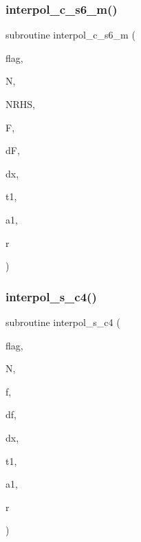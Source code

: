 \subsubsection{\texorpdfstring{interpol\+\_\+c\+\_\+s6\+\_\+m()}{interpol\_c\_s6\_m()}}
{\footnotesize\ttfamily subroutine interpol\+\_\+c\+\_\+s6\+\_\+m (\begin{DoxyParamCaption}\item[{character$\ast$1}]{flag,  }\item[{integer}]{N,  }\item[{}]{N\+R\+HS,  }\item[{real, dimension(0\+:n,nrhs)}]{F,  }\item[{real, dimension(n,nrhs)}]{dF,  }\item[{real}]{dx,  }\item[{real, dimension(n,n)}]{t1,  }\item[{real, dimension(n,n+1)}]{a1,  }\item[{real, dimension(n,n+1)}]{r }\end{DoxyParamCaption})}

\mbox{\label{ders__n_8f_acc3677e674af0677ddcebe275095f2ba}} 
\subsubsection{\texorpdfstring{interpol\+\_\+s\+\_\+c4()}{interpol\_s\_c4()}}
{\footnotesize\ttfamily subroutine interpol\+\_\+s\+\_\+c4 (\begin{DoxyParamCaption}\item[{character$\ast$1}]{flag,  }\item[{integer}]{N,  }\item[{real, dimension(n)}]{f,  }\item[{real, dimension(0\+:n)}]{df,  }\item[{real}]{dx,  }\item[{real, dimension(n+1,n+1)}]{t1,  }\item[{real, dimension(n+1,n)}]{a1,  }\item[{real, dimension(! n+1,n)}]{r }\end{DoxyParamCaption})}

\mbox{\label{ders__n_8f_aa85fcad97cd803e15561b91ddca1e34e}} 
